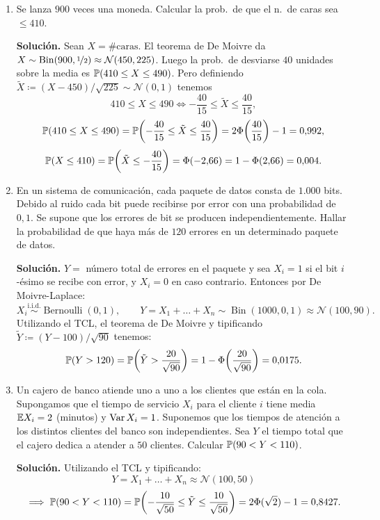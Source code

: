 \begin{enumerate}
  \item Se lanza $900$ veces una moneda. Calcular la prob.\ de que el n.\ de caras sea $\le 410$.

  \textbf{Solución.} Sean $X = \#\text{caras}$. El teorema de De Moivre da $X \sim \operatorname{Bin}(900, \nicefrac{1}{2}) \approx \mathcal{N}(450, 225)$.
  Luego la prob.\ de desviarse $40$ unidades sobre la media es $\mathbb{P}(410 \le X \le 490)$. Pero definiendo $\tilde{X} \coloneqq (X - 450)/\sqrt{225} \sim \mathcal{N}(0,1)$ tenemos
  \[
    410 \le X \le 490 \iff -\frac{40}{15} \le \tilde{X} \le \frac{40}{15},
  \]
  \[
    \mathbb{P}(410 \le X \le 490) = \mathbb{P}\!\left(-\frac{40}{15} \le \tilde{X} \le \frac{40}{15}\right) = 2\Phi\!\left(\frac{40}{15}\right) - 1 = 0{,}992,
  \]
  \[
    \mathbb{P}(X \le 410) = \mathbb{P}\!\left(\tilde{X} \le -\frac{40}{15}\right) = \Phi(-2{,}66) = 1 - \Phi(2{,}66) = 0{,}004.
  \]

  \item En un sistema de comunicación, cada paquete de datos consta de $1.000$ bits. Debido al ruido cada bit puede recibirse por error con una probabilidad de $0{,}1$. Se supone que los errores de bit se producen independientemente. Hallar la probabilidad de que haya más de $120$ errores en un determinado paquete de datos.

  \textbf{Solución.} $Y =$ número total de errores en el paquete y sea $X_i = 1$ si el bit $i$-ésimo se recibe con error, y $X_i = 0$ en caso contrario. Entonces por De Moivre-Laplace:
  \[
    X_i \stackrel{\text{i.i.d.}}{\sim} \operatorname{Bernoulli}(0{,}1), \qquad Y = X_1 + \dots + X_n \sim \operatorname{Bin}(1000, 0{,}1) \approx \mathcal{N}(100, 90).
  \]
  Utilizando el TCL, el teorema de De Moivre y tipificando $\tilde{Y} \coloneqq (Y - 100)/\sqrt{90}$ tenemos:
  \[
    \mathbb{P}(Y > 120) = \mathbb{P}\!\left(\tilde{Y} > \frac{20}{\sqrt{90}}\right) = 1 - \Phi\!\left(\frac{20}{\sqrt{90}}\right) = 0{,}0175.
  \]

  \item Un cajero de banco atiende uno a uno a los clientes que están en la cola. Supongamos que el tiempo de servicio $X_i$ para el cliente $i$ tiene media $\mathbb{E} X_i = 2$ (minutos) y $\operatorname{Var} X_i = 1$. Suponemos que los tiempos de atención a los distintos clientes del banco son independientes. Sea $Y$ el tiempo total que el cajero dedica a atender a $50$ clientes. Calcular $\mathbb{P}(90 < Y < 110)$.

  \textbf{Solución.} Utilizando el TCL y tipificando:
  \[
    Y = X_1 + \dots + X_n \approx \mathcal{N}(100, 50)\] 
    \[ \implies \mathbb{P}(90 < Y < 110) = \mathbb{P}\!\left(-\frac{10}{\sqrt{50}} \le \tilde{Y} \le \frac{10}{\sqrt{50}}\right) = 2\Phi(\sqrt{2}) - 1 = 0{,}8427.
  \]


\end{enumerate}
